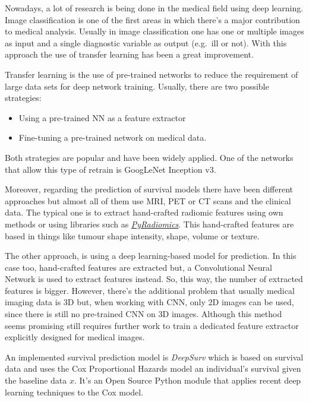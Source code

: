Nowadays, a lot of research is being done in the medical field using deep learning. Image
classification is one of the first areas in which there's a major contribution to medical analysis.
Usually in image classification one has one or multiple images as input and a single diagnostic 
variable as output (e.g.~ill or not). With this approach the use of transfer learning has been a
great improvement.
~\cite{medical:survey-deep-learning}

Transfer learning is the use of pre-trained networks to reduce the requirement of large data
sets for deep network training. Usually, there are two possible strategies: 
\begin{itemize}[noitemsep, topsep=0pt]
  \item Using a pre-trained NN as a feature extractor
  \item Fine-tuning a pre-trained network on medical data.
\end{itemize}

Both strategies are popular and have been widely applied. One of the networks that allow this type
of retrain is GoogLeNet Inception v3.
~\cites{neural:GoogLeNet}{neural:NNRetrain}{neural:inceptionRetrain}

Moreover, regarding the prediction of survival models there have been different approaches but
almost all of them use MRI, PET or CT scans and the clinical data. The typical one is to extract
hand-crafted radiomic features using own methods or using libraries such as
\href{https://github.com/Radiomics/pyradiomics}{\emph{PyRadiomics}}. This hand-crafted features are
based in things like tumour shape intensity, shape, volume or texture.
~\cites{medical:tumour-radiomics}{medical:PyRadiomics}

The other approach, is using a deep learning-based model for prediction. In this case too, 
hand-crafted features are extracted but, a Convolutional Neural Network is used to extract
features instead. So, this way, the number of extracted features is bigger. However,
there's the additional problem that usually medical imaging data is 3D but, when working 
with CNN, only 2D images can be used, since there is still no pre-trained CNN on 3D images.
Although this method seems promising still requires further work to train a dedicated 
feature extractor explicitly designed for medical images.
~\cite{medical:deep-learning-radiomics-gbm}

An implemented survival prediction model is \emph{DeepSurv} which is based on survival data
and uses the Cox Proportional Hazards model an individual's survival given the baseline data
\( x \). It's an Open Source Python module that applies recent deep learning techniques 
to the Cox model.
~\cites{medical:DeepSurv}{medical:Cox}

